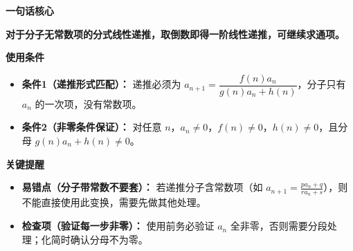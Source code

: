 \begin{summarybox}
	\textbf{\textcolor{CSummary}{一句话核心}}

	\textbf{对于分子无常数项的分式线性递推，取倒数即得一阶线性递推，可继续求通项。}

	\medskip
	\textbf{\textcolor{CSummary}{使用条件}}
	\begin{itemize}[leftmargin=*, itemsep=0.5em, topsep=0.4em]
		\item \textbf{条件1（递推形式匹配）：} 递推必须为 $a_{n+1}=\dfrac{f(n)a_n}{g(n)a_n+h(n)}$，分子只有 $a_n$ 的一次项，没有常数项。
		\item \textbf{条件2（非零条件保证）：} 对任意 $n$，$a_n\neq 0$，$f(n)\neq 0$，$h(n)\neq 0$，且分母 $g(n)a_n+h(n)\neq 0$。
	\end{itemize}

	\medskip
	\textbf{\textcolor{CSummary}{关键提醒}}
	\begin{itemize}[leftmargin=*, itemsep=0.5em, topsep=0.4em]
		\item \textbf{易错点（分子带常数不要套）：} 若递推分子含常数项（如 $a_{n+1}=\frac{p a_n+q}{r a_n+s}$），则不能直接使用此变换，需要先做其他处理。
		\item \textbf{检查项（验证每一步非零）：} 使用前务必验证 $a_n$ 全非零，否则需要分段处理；化简时确认分母不为零。
	\end{itemize}
\end{summarybox}
